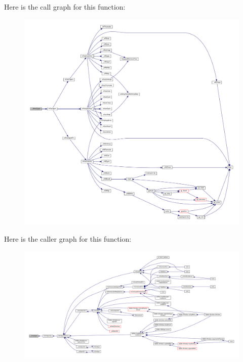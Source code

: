 Here is the call graph for this function\+:
\nopagebreak
\begin{figure}[H]
\begin{center}
\leavevmode
\includegraphics[width=350pt]{vfs-zip_8c_aab51e4c401779a6979ba1574b9f4c714_cgraph}
\end{center}
\end{figure}
Here is the caller graph for this function\+:
\nopagebreak
\begin{figure}[H]
\begin{center}
\leavevmode
\includegraphics[width=350pt]{vfs-zip_8c_aab51e4c401779a6979ba1574b9f4c714_icgraph}
\end{center}
\end{figure}
\mbox{\label{vfs-zip_8c_a3521a7ab612e84b95da1cf213cb061ee}} 
